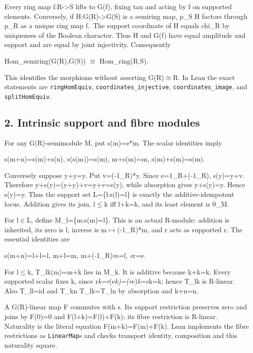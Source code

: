 Every ring map f:R-\textgreater S lifts to G(f), fixing tau and acting
by f on supported elements. Conversely, if H:G(R)-\textgreater G(S) is a
semiring map, p\_S H factors through p\_R as a unique ring map f.~The
support coordinate of H equals chi\_R by uniqueness of the Boolean
character. Thus H and G(f) have equal amplitude and support and are
equal by joint injectivity. Consequently

Hom\_semiring(G(R),G(S)) \ensuremath{\cong} Hom\_ring(R,S).

This identifies the morphisms without asserting G(R)\ensuremath{\cong}R. In Lean the
exact statements are \texttt{ringHomEquiv},
\texttt{coordinates\_injective}, \texttt{coordinates\_image}, and
\texttt{splitHomEquiv}.

\subsection{2. Intrinsic support and fibre
modules}\label{InheritedStructuralStage:intrinsic-support-and-fibre-modules}

For any G(R)-semimodule M, put s(m)=e*m. The scalar identities imply

s(m+n)=s(m)+s(n), s(s(m))=s(m), m+s(m)=m, s(m)+s(m)=s(m).

Conversely suppose y+y=y. Put v=(-1\_R)*y. Since e=1\_R+(-1\_R),
s(y)=y+v. Therefore y+s(y)=(y+y)+v=y+v=s(y), while absorption gives
y+s(y)=y. Hence s(y)=y. Thus the support set L=\{l:s(l)=l\} is exactly
the additive-idempotent locus. Addition gives its join, l\ensuremath{\le}k iff l+k=k,
and its least element is 0\_M.

For l\ensuremath{\in}L, define M\_l=\{m:s(m)=l\}. This is an actual R-module: addition
is inherited, its zero is l, inverse is m\ensuremath{\mapsto}(-1\_R)*m, and r acts as
supported r. The essential identities are

s(m+n)=l+l=l, m+l=m, m+(-1\_R)\emph{m=l, e}r=e.

For l\ensuremath{\le}k, T\_lk(m)=m+k lies in M\_k. It is additive because k+k=k. Every
supported scalar fixes k, since
r\emph{k=r}(e\emph{k)=(r}e)\emph{k=e}k=k; hence T\_lk is R-linear. Also
T\_ll=id and T\_kn T\_lk=T\_ln by absorption and k+n=n.

A G(R)-linear map F commutes with s. Its support restriction preserves
zero and joins by F(0)=0 and F(l+k)=F(l)+F(k); its fibre restriction is
R-linear. Naturality is the literal equation F(m+k)=F(m)+F(k). Lean
implements the fibre restrictions as \texttt{LinearMap}s and checks
transport identity, composition and this naturality square.

